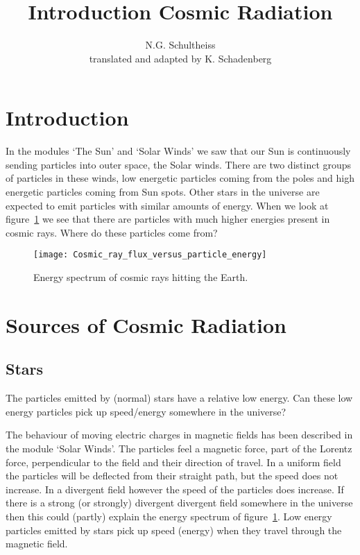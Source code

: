 


\author{N.G. Schultheiss \\ translated and adapted by K. Schadenberg}
\date{}
\title{Introduction Cosmic Radiation}



\maketitle

\section{Introduction}
In the modules `The Sun' and `Solar Winds' we saw that our Sun is continuously sending particles into outer space, the Solar winds. There are two distinct groups of particles in these winds, low energetic particles coming from the poles and high energetic particles coming from Sun spots. Other stars in the universe are expected to emit particles with similar amounts of energy. When we look at figure~\ref{fig:spectrum} we see that there are particles with much higher energies present in cosmic rays. Where do these particles come from?

\begin{figure}\begin{center}
\texttt{[image: Cosmic\_ray\_flux\_versus\_particle\_energy]}%
\caption{Energy spectrum of cosmic rays hitting the Earth.}\label{fig:spectrum}
\end{center}\end{figure}

\section{Sources of Cosmic Radiation}
\subsection{Stars}
The particles emitted by (normal) stars have a relative low energy. Can these low energy particles pick up speed/energy somewhere in the universe?

The behaviour of moving electric charges in magnetic fields has been described in the module `Solar Winds'. The particles feel a magnetic force, part of the Lorentz force, perpendicular to the field and their direction of travel. In a uniform field the particles will be deflected from their straight path, but the speed does not increase. In a divergent field however the speed of the particles does increase. If there is a strong (or strongly) divergent divergent field somewhere in the universe then this could (partly) explain the energy spectrum of figure~\ref{fig:spectrum}. Low energy particles emitted by stars pick up speed (energy) when they travel through the magnetic field.

